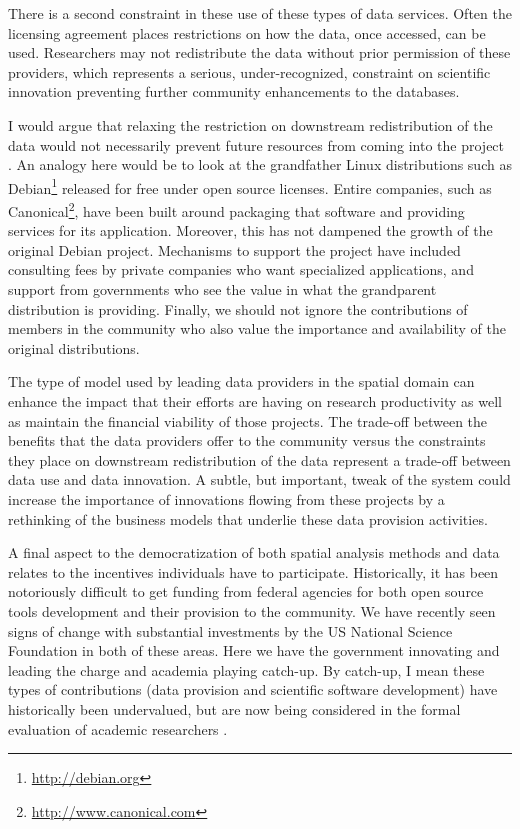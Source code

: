 \documentclass[11pt]{article}
\begin{document}
There is a second constraint in these use of these types of data services.
Often the licensing agreement places restrictions on how the data, once
accessed, can be used. Researchers may not redistribute the data without prior
permission of these providers, which represents a serious, under-recognized,
constraint on scientific innovation preventing further community enhancements
to the databases.


I would argue that relaxing the restriction on downstream redistribution of the
data would not necessarily prevent future resources from coming into the project
\cite{rey_open_2014}. An analogy here would be to look at the grandfather Linux
distributions such as Debian\footnote{\url{http://debian.org}} released for free
under open source licenses. Entire companies, such as
Canonical\footnote{\url{http://www.canonical.com}}, have been built around
packaging that software and providing services for its application. Moreover,
this has not dampened the growth of the original Debian project. Mechanisms to
support the project have included consulting fees by private companies who want
specialized applications, and support from governments who see the value in what
the grandparent distribution is providing. Finally, we should not ignore the
contributions of members in the community who also value the importance and
availability of the original distributions.


The type of model used by leading data providers in the spatial domain can
enhance the impact that their efforts are having on research productivity as
well as maintain the financial viability of those projects. The trade-off
between the benefits that the data providers offer to the community versus
the constraints they place on downstream redistribution of the data represent a
trade-off between data use and data innovation. A subtle, but important, tweak of
the system could increase the importance of innovations flowing from these
projects by a rethinking of the business models that underlie these data 
provision activities.

A final aspect to the democratization of both spatial analysis methods and data
relates to the incentives individuals have to participate. Historically, it has
been notoriously difficult to get funding from federal agencies for both open
source tools development and their provision to the community. We have recently
seen signs of change with substantial investments by the US National Science
Foundation in both of these areas. Here we have the government innovating and
leading the charge and academia playing catch-up. By catch-up, I mean these
types of contributions (data provision and scientific software development) have
historically been undervalued, but are now being considered in the formal
evaluation of academic researchers \cite{eghbal2016roads}.
\end{document}
